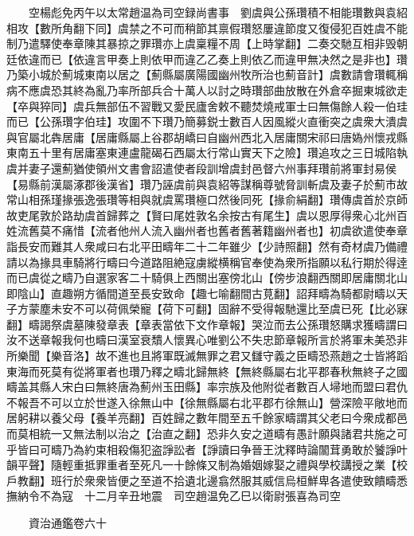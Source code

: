　　空楊彪免丙午以太常趙温為司空録尚書事　劉虞與公孫瓚積不相能瓚數與袁紹相攻【數所角翻下同】虞禁之不可而稍節其禀假瓚怒屢違節度又復侵犯百姓虞不能制乃遣驛使奉章陳其暴掠之罪瓚亦上虞稟糧不周【上時掌翻】二奏交馳互相非毁朝廷依違而已【依違言甲奏上則依甲而違乙乙奏上則依乙而違甲無决然之是非也】瓚乃築小城於薊城東南以居之【薊縣屬廣陽國幽州牧所治也薊音計】虞數請會瓚輒稱病不應虞恐其終為亂乃率所部兵合十萬人以討之時瓚部曲放散在外倉卒掘東城欲走【卒與猝同】虞兵無部伍不習戰又愛民廬舍敕不聽焚燒戒軍士曰無傷餘人殺一伯珪而已【公孫瓚字伯珪】攻圍不下瓚乃簡募鋭士數百人因風縱火直衝突之虞衆大潰虞與官屬北犇居庸【居庸縣屬上谷郡胡嶠曰自幽州西北入居庸關宋祁曰唐媯州懷戎縣東南五十里有居庸塞東連盧龍碣石西屬太行常山實天下之險】瓚追攻之三日城陷執虞并妻子還薊猶使領州文書會詔遣使者段訓增虞封邑督六州事拜瓚前將軍封易侯【易縣前漢屬涿郡後漢省】瓚乃誣虞前與袁紹等謀稱尊號脅訓斬虞及妻子於薊市故常山相孫瑾掾張逸張瓚等相與就虞罵瓚極口然後同死【掾俞絹翻】瓚傳虞首於京師故吏尾敦於路劫虞首歸葬之【賢曰尾姓敦名余按古有尾生】虞以恩厚得衆心北州百姓流舊莫不痛惜【流者他州人流入幽州者也舊者舊著籍幽州者也】初虞欲遣使奉章詣長安而難其人衆咸曰右北平田疇年二十二年雖少【少詩照翻】然有奇材虞乃備禮請以為掾具車騎將行疇曰今道路阻絶寇虜縱横稱官奉使為衆所指願以私行期於得逹而已虞從之疇乃自選家客二十騎俱上西關出塞傍北山【傍步浪翻西關即居庸關北山即陰山】直趣朔方循間道至長安致命【趣七喻翻間古莧翻】詔拜疇為騎都尉疇以天子方蒙塵未安不可以荷佩榮寵【荷下可翻】固辭不受得報馳還比至虞已死【比必寐翻】疇謁祭虞墓陳發章表【章表當依下文作章報】哭泣而去公孫瓚怒購求獲疇謂曰汝不送章報我何也疇曰漢室衰穨人懷異心唯劉公不失忠節章報所言於將軍未美恐非所樂聞【樂音洛】故不進也且將軍既滅無罪之君又讎守義之臣疇恐燕趙之士皆將蹈東海而死莫有從將軍者也瓚乃釋之疇北歸無終【無終縣屬右北平郡春秋無終子之國疇盖其縣人宋白曰無終唐為薊州玉田縣】率宗族及他附從者數百人埽地而盟曰君仇不報吾不可以立於世遂入徐無山中【徐無縣屬右北平郡冇徐無山】營深險平敞地而居躬耕以養父母【養羊亮翻】百姓歸之數年間至五千餘家疇謂其父老曰今衆成都邑而莫相統一又無法制以治之【治直之翻】恐非久安之道疇有愚計願與諸君共施之可乎皆曰可疇乃為約束相殺傷犯盗諍訟者【諍讀曰争晉王沈釋時論闟茸勇敢於饕諍叶韻平聲】隨輕重抵罪重者至死凡一十餘條又制為婚姻嫁娶之禮與學校講授之業【校戶教翻】班行於衆衆皆便之至道不拾遺北邊翕然服其威信烏桓鮮卑各遣使致饋疇悉撫納令不為寇　十二月辛丑地震　司空趙温免乙巳以衛尉張喜為司空

　　資治通鑑卷六十


    


 


 




